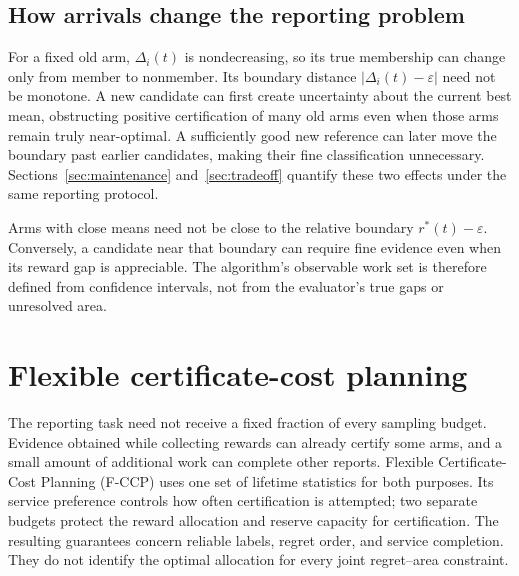 \documentclass[11pt]{article}
\theoremstyle{remark}
\begin{document}
\subsection{How arrivals change the reporting problem}

For a fixed old arm, $\Delta_i(t)$ is nondecreasing, so its true membership
can change only from member to nonmember. Its boundary distance
$|\Delta_i(t)-\varepsilon|$ need not be monotone. A new candidate can first
create uncertainty about the current best mean, obstructing positive
certification of many old arms even when those arms remain truly
near-optimal. A sufficiently good new reference can later move the
boundary past earlier candidates, making their fine classification
unnecessary. Sections~\ref{sec:maintenance} and~\ref{sec:tradeoff} quantify
these two effects under the same reporting protocol.


Arms with close means need not be close to the relative boundary
$r^*(t)-\varepsilon$. Conversely, a candidate near that boundary can
require fine evidence even when its reward gap is appreciable. The
algorithm's observable work set is therefore defined from confidence
intervals, not from the evaluator's true gaps or unresolved area.
\section{Flexible certificate-cost planning}\label{sec:fccp}\label{sec:method}
The reporting task need not receive a fixed fraction of every sampling
budget. Evidence obtained while collecting rewards can already certify
some arms, and a small amount of additional work can complete other
reports. Flexible Certificate-Cost Planning (F-CCP) uses one set of lifetime
statistics for both purposes. Its service preference controls how often
certification is attempted; two separate budgets protect the reward
allocation and reserve capacity for certification. The resulting guarantees
concern reliable labels, regret order, and service completion. They do not
identify the optimal allocation for every joint regret--area constraint.
\end{document}
